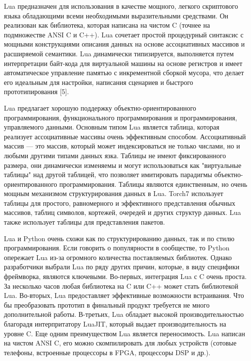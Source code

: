 \documentclass[a4paper,english,russian]{G2-105}
\begin{document}
\par Lua предназначен для использования в качестве мощного, легкого скриптового языка обладающими всеми необходимыми выразительными средствами. Он реализован как библиотека, которая написана на чистом C (точнее на подмножестве ANSI C и C++). Lua сочетает простой процедурный синтаксис с мощными конструкциями описания данных на основе ассоциативных массивов и расширяемой семантики. Lua динамически типизируется, выполняется путем интерпретации байт-кода для виртуальной машины на основе регистров и имеет автоматическое управление памятью с инкрементной сборкой мусора, что делает его идеальным для настройки, написания сценариев и быстрого прототипирования [5].
\par Lua предлагает хорошую поддержку объектно-ориентированного программирования, функционального программирования и программирования, управляемого данными. Основным типом Lua является таблица, которая реализует ассоциативные массивы очень эффективным способом. Ассоциативный массив --- это массив, который может индексироваться не только числами, но и любыми другими типами данных язка. Таблицы не имеют фиксированного размера, они динамически изменяемы и могут использоваться как "виртуальные таблицы" над другой таблицей, что позволяет имитировать парадигмы объектно-ориентированного программирования. Таблицы являются единственным, но очень мощным механизмом структурирования данных в Lua. Torch7 использует таблицы для простого, равномерного и эффективного представления обычных массивов, таблиц символов, кортежей, очередей и других структур данных. Lua также использует таблицы для представления пакетов.
\par Lua и Python очень схожи как по структурированию данных, так и по стилю программирования. Если говорить о популярности в сообществе, то Python опережает Lua из-за огромного количества поставляемых библиотек. Однако разработчики выбрали Lua по ряду других причин, которые, в виду специфики фреймворка, являются ключевыми. Во-первых, интеграция Lua с C очень проста. За несколько часов любая библиотека на C или C++ может стать библиотекой Lua. Во-вторых, Lua предоставляет эффективные возможности встраивания. Что бы преобразовать прототип в финальный продукт требуется не много дополнительной работы. В-третьих, Lua обладает высокой производительностью благорадя интерпритатору LuaJIT, который выдает производительность на уровне C. Еще одним преимуществом Lua является переносимость. Lua написан на чистом ANSI C, его можно скомпилировать для любых устройств (сотовые телефоны, встроенные процессоры в FPGA, процессоры DSP и др.).
\ttl
\end{document}
